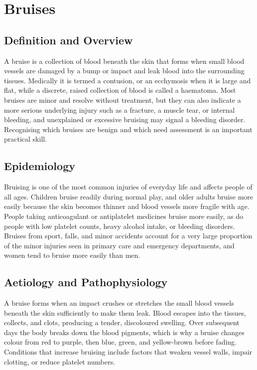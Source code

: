 \chapter{Bruises}

\section*{Definition and Overview}
A bruise is a collection of blood beneath the skin that forms when small blood vessels are damaged by a bump or impact and leak blood into the surrounding tissues. Medically it is termed a contusion, or an ecchymosis when it is large and flat, while a discrete, raised collection of blood is called a haematoma. Most bruises are minor and resolve without treatment, but they can also indicate a more serious underlying injury such as a fracture, a muscle tear, or internal bleeding, and unexplained or excessive bruising may signal a bleeding disorder. Recognising which bruises are benign and which need assessment is an important practical skill.

\section*{Epidemiology}
Bruising is one of the most common injuries of everyday life and affects people of all ages. Children bruise readily during normal play, and older adults bruise more easily because the skin becomes thinner and blood vessels more fragile with age. People taking anticoagulant or antiplatelet medicines bruise more easily, as do people with low platelet counts, heavy alcohol intake, or bleeding disorders. Bruises from sport, falls, and minor accidents account for a very large proportion of the minor injuries seen in primary care and emergency departments, and women tend to bruise more easily than men.

\section*{Aetiology and Pathophysiology}
A bruise forms when an impact crushes or stretches the small blood vessels beneath the skin sufficiently to make them leak. Blood escapes into the tissues, collects, and clots, producing a tender, discoloured swelling. Over subsequent days the body breaks down the blood pigments, which is why a bruise changes colour from red to purple, then blue, green, and yellow-brown before fading. Conditions that increase bruising include factors that weaken vessel walls, impair clotting, or reduce platelet numbers.

